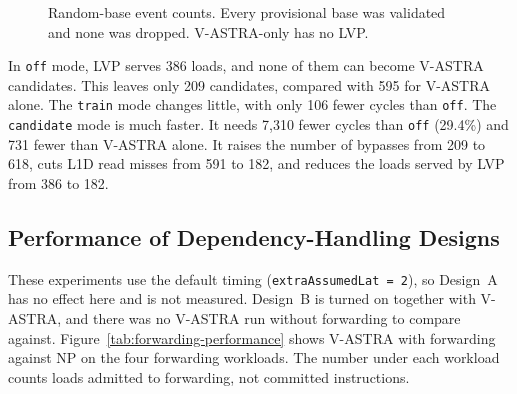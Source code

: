 \begin{figure}[H]
    \centering
    \caption{Random-base event counts. Every provisional base was
    validated and none was dropped. V-ASTRA-only has no LVP.}
    \label{tab:randbase-mode-events}
\end{figure}

In \texttt{off} mode, LVP serves 386 loads, and none of them can
become V-ASTRA candidates. This leaves only 209 candidates, compared
with 595 for V-ASTRA alone. The \texttt{train} mode changes little,
with only 106 fewer cycles than \texttt{off}. The \texttt{candidate}
mode is much faster. It needs 7,310 fewer cycles than \texttt{off}
(29.4\%) and 731 fewer than V-ASTRA alone. It raises the number of
bypasses from 209 to 618, cuts L1D read misses from 591 to 182, and
reduces the loads served by LVP from 386 to 182.

\subsection{Performance of Dependency-Handling Designs}
\label{subsec:dependency-performance}

These experiments use the default timing (\texttt{extraAssumedLat =
2}), so Design~A has no effect here and is not measured. Design~B is
turned on together with V-ASTRA, and there was no V-ASTRA run without
forwarding to compare against. Figure~\ref{tab:forwarding-performance} shows V-ASTRA with
forwarding against NP on the four forwarding workloads. The number
under each workload counts loads admitted to forwarding, not
committed instructions.

